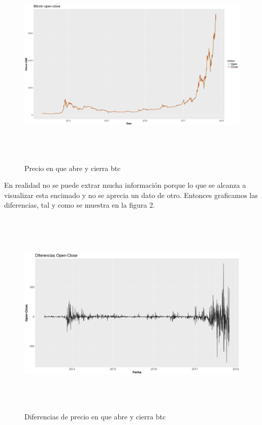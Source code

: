 \documentclass[12pt,letterpaper]{article}
\begin{document}
    \begin{figure}
        \centering

        \includegraphics[width = 18cm, height = 10cm]{btc/date_vs_open-close}

        \caption{Precio en que abre y cierra btc}
    \end{figure}

    En realidad no se puede extrar mucha informaci\'on porque lo que se alcanza a visualizar esta encimado y no se aprecia un dato de otro. Entonces graficamos las diferencias, tal y como se muestra en la figura 2.

    \begin{figure}
        \centering

        \includegraphics[width = 18cm, height = 10cm]{btc/diferencias_BTC_OpenClose}

        \caption{Diferencias de precio en que abre y cierra btc}
    \end{figure}
\end{document}
